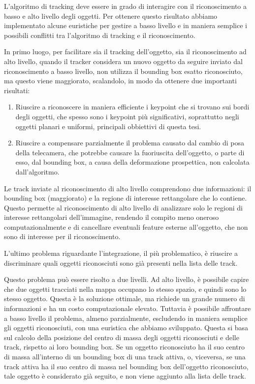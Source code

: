 L'algoritmo di tracking deve essere in grado di interagire con il riconoscimento a basso e alto livello degli oggetti. Per ottenere questo risultato abbiamo implementato alcune euristiche per gestire a basso livello e in maniera semplice i possibili conflitti tra l'algoritmo di tracking e il riconoscimento.

In primo luogo, per facilitare sia il tracking dell'oggetto, sia il riconoscimento ad alto livello, quando il tracker considera un nuovo oggetto da seguire inviato dal riconoscimento a basso livello, non utilizza il bounding box esatto riconosciuto, ma questo viene maggiorato, scalandolo, in modo da ottenere due importanti risultati:

\begin{enumerate}
 \item Riuscire a riconoscere in maniera efficiente i keypoint che si trovano sui bordi degli oggetti, che spesso sono i keypoint più significativi, soprattutto negli oggetti planari e uniformi, principali obbiettivi di questa tesi.
 \item Riuscire a compensare parzialmente il problema causato dal cambio di posa della telecamera, che potrebbe causare la fuoriuscita dell'oggetto, o parte di esso, dal bounding box, a causa della deformazione prospettica, non calcolata dall'algoritmo.
\end{enumerate}

Le track inviate al riconoscimento di alto livello comprendono due informazioni: il bounding box (maggiorato) e la regione di interesse rettangolare che lo contiene. Questo permette al riconoscimento di alto livello di analizzare solo le regioni di interesse rettangolari dell'immagine, rendendo il compito meno oneroso computazionalmente e di cancellare eventuali feature esterne all'oggetto, che non sono di interesse per il riconoscimento.

L'ultimo problema riguardante l'integrazione, il più problematico, è riuscire a discriminare quali oggetti riconosciuti sono già presenti nella lista delle track.

Questo problema può essere risolto a due livelli. Ad alto livello, è possibile capire che due oggetti tracciati nella mappa occupano lo stesso spazio, e quindi sono lo stesso oggetto. Questa è la soluzione ottimale, ma richiede un grande numero di informazioni e ha un costo computazionale elevato. 
Tuttavia è possibile affrontare a basso livello il problema, almeno parzialmente, escludendo in maniera semplice gli oggetti riconosciuti, con una euristica che abbiamo sviluppato. 
Questa si basa sul calcolo della posizione del centro di massa degli oggetti riconosciuti e delle track, rispetto ai loro bounding box.
Se un oggetto riconosciuto ha il suo centro di massa all'interno di un bounding box di una track attiva, o, viceversa, se una track attiva ha il suo centro di massa nel bounding box dell'oggetto riconosciuto, tale oggetto è considerato già seguito, e non viene aggiunto alla lista delle track.

